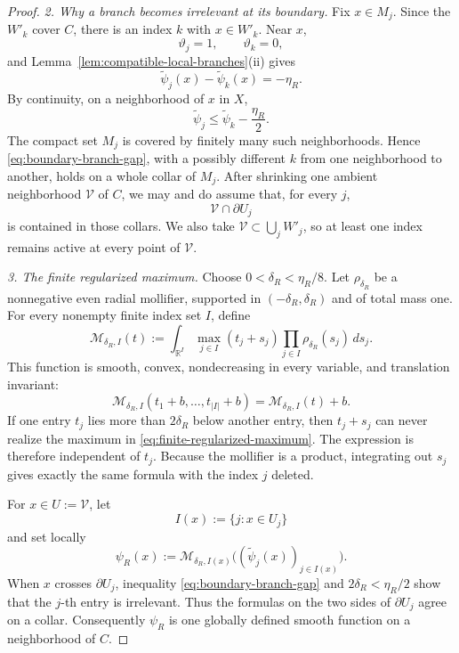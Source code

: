 \documentclass[reqno]{amsart}
\theoremstyle{remark}
\theoremstyle{plain}
\begin{document}
\begin{proof}
\smallskip
\noindent\emph{2. Why a branch becomes irrelevant at its boundary.}
Fix $x\in M_j$.  Since the $W'_k$ cover $C$, there is an index
$k$ with $x\in W'_k$.  Near $x$,
\[
 \vartheta_j=1,\qquad\vartheta_k=0,
\]
and Lemma~\ref{lem:compatible-local-branches}(ii) gives
\[
 \widetilde\psi_j(x)-\widetilde\psi_k(x)=-\eta_R.
\]
By continuity, on a neighborhood of $x$ in $X$,
\begin{equation}\label{eq:boundary-branch-gap}
 \widetilde\psi_j
 \leq\widetilde\psi_k-\frac{\eta_R}{2}.
\end{equation}
The compact set $M_j$ is covered by finitely many such
neighborhoods.  Hence \eqref{eq:boundary-branch-gap}, with a possibly
different $k$ from one neighborhood to another, holds on a whole
collar of $M_j$.  
After shrinking one ambient neighborhood $\mathcal V$ of $C$, we
may and do assume that, for every $j$,
\[
 \mathcal V\cap\partial U_j
\]
is contained in those collars.  We also take
$\mathcal V\subset\bigcup_jW'_j$, so at least one index remains
active at every point of $\mathcal V$.

\smallskip
\noindent\emph{3. The finite regularized maximum.}
Choose $0<\delta_R<\eta_R/8$.  Let
$\rho_{\delta_R}$ be a nonnegative even radial mollifier,
supported in $(-\delta_R,\delta_R)$ and of total mass one.  For every
nonempty finite index set $I$, define
\begin{equation}\label{eq:finite-regularized-maximum}
 \mathcal M_{\delta_R,I}(t)
 :=
 \int_{\mathbb R^I}
 \max_{j\in I}(t_j+s_j)
 \prod_{j\in I}\rho_{\delta_R}(s_j)\,ds_j.
\end{equation}
This function is smooth, convex, nondecreasing in every variable, and
translation invariant:
\[
 \mathcal M_{\delta_R,I}(t_1+b,\ldots,t_{|I|}+b)
 =
 \mathcal M_{\delta_R,I}(t)+b.
\]
If one entry $t_j$ lies more than $2\delta_R$ below another entry,
then $t_j+s_j$ can never realize the maximum in
\eqref{eq:finite-regularized-maximum}.  The expression is therefore
independent of $t_j$.  Because the mollifier is a product, integrating
out $s_j$ gives exactly the same formula with the index $j$
deleted.

For $x\in U:=\mathcal V$, let
\[
 I(x):=\{j:x\in U_j\}
\]
and set locally
\begin{equation}\label{eq:richberg-global-correction}
 \psi_R(x)
 :=
 \mathcal M_{\delta_R,I(x)}
 \bigl((\widetilde\psi_j(x))_{j\in I(x)}\bigr).
\end{equation}
When $x$ crosses $\partial U_j$, inequality
\eqref{eq:boundary-branch-gap} and
$2\delta_R<\eta_R/2$ show that the $j$-th entry is irrelevant.
Thus the formulas on the two sides of $\partial U_j$ agree on a
collar.  Consequently $\psi_R$ is one globally defined smooth
function on a neighborhood of $C$.


\end{proof}
\end{document}
